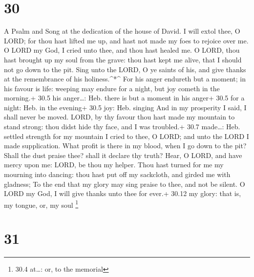 \hypertarget{section-29}{%
\section{30}\label{section-29}}

A Psalm and Song at the dedication of the house of David.  I
will extol thee, O LORD; for thou hast lifted me up, and hast not made
my foes to rejoice over me.  O LORD my God, I cried unto
thee, and thou hast healed me.  O LORD, thou hast brought up
my soul from the grave: thou hast kept me alive, that I should not go
down to the pit.  Sing unto the LORD, O ye saints of his,
and give thanks at the remembrance of his holiness.\^{}*\^{}
 For his anger endureth but a moment; in his favour is life:
weeping may endure for a night, but joy cometh in the morning.+ 30.5 his
anger\ldots: Heb. there is but a moment in his anger+ 30.5 for a night:
Heb. in the evening+ 30.5 joy: Heb. singing  And in my
prosperity I said, I shall never be moved.  LORD, by thy
favour thou hast made my mountain to stand strong: thou didst hide thy
face, and I was troubled.+ 30.7 made\ldots: Heb. settled strength for my
mountain  I cried to thee, O LORD; and unto the LORD I made
supplication.  What profit is there in my blood, when I go
down to the pit? Shall the dust praise thee? shall it declare thy truth?
 Hear, O LORD, and have mercy upon me: LORD, be thou my
helper.  Thou hast turned for me my mourning into dancing:
thou hast put off my sackcloth, and girded me with gladness;
 To the end that my glory may sing praise to thee, and not
be silent. O LORD my God, I will give thanks unto thee for ever.+ 30.12
my glory: that is, my tongue, or, my soul \footnote{30.4 at\ldots: or,
  to the memorial}

\hypertarget{section-30}{%
\section{31}\label{section-30}}

